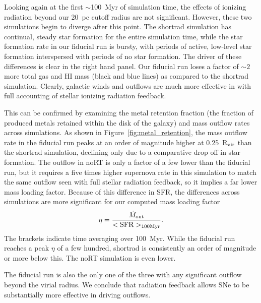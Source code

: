 \documentclass[twocolumn]{aastex62}
\begin{document}
Looking again at the first $\sim$100~Myr of simulation time, the effects of ionizing radiation beyond our 20~pc cutoff radius are not significant. However, these two simulations begin to diverge after this point. The shortrad simulation has continual, steady star formation for the entire simulation time, while the star formation rate in our fiducial run is bursty, with periods of active, low-level star formation interspersed with periods of no star formation. The driver of these differences is clear in the right hand panel. Our fiducial run loses a factor of $\sim 2$ more total gas and HI mass (black and blue lines) as compared to the shortrad simulation. Clearly, galactic winds and outflows are much more effective in with full accounting of stellar ionizing radiation feedback.

This can be confirmed by examining the metal retention fraction (the fraction of produced metals retained within the disk of the galaxy) and mass outflow rates across simulations. As shown in Figure~\ref{fig:metal_retention}, the mass outflow rate in the fiducial run peaks at an order of magnitude higher at 0.25~R$_{\rm vir}$ than the shortrad simulation, declining only due to a comparative drop off in star formation. The outflow in noRT is only a factor of a few lower than the fiducial run, but it requires a five times higher supernova rate in this simulation to match the same outflow seen with full stellar radiation feedback, so it implies a far lower mass loading factor. Because of this difference in SFR, 
the differences across simulations are more significant for our computed mass loading factor 
\begin{equation}
    \eta = \frac{ \dot{M}_{\rm out}}{ <\rm{SFR}>_{100 \rm{Myr}}}.
\end{equation} The brackets indicate time averaging over 100~Myr.
%
While the fiducial run reaches a peak $\eta$ of a few hundred, shortrad is consistently an order of magnitude or more below this. The noRT simulation is even lower. 

The fiducial run is also the only one of the three with any significant outflow beyond the virial radius. We conclude that radiation feedback allows SNe to be substantially more effective in driving outflows. 
\end{document}

